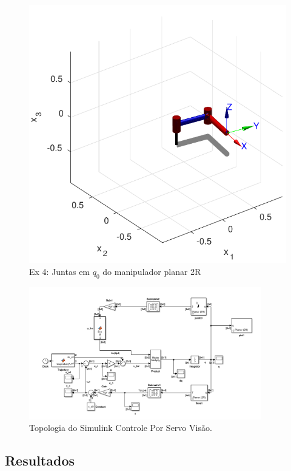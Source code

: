 \documentclass[a4paper,11pt]{article}
\theoremstyle{mytheor}
\begin{document}
\begin{figure}[ht]
\centering
\includegraphics[width=1\textwidth]{figs/ex3_planar_tetha0.pdf}
\caption{Ex 4: Juntas em $q_0$ do manipulador planar 2R}
\label{fig:ex3_planar}
\end{figure}

\begin{figure}[!ht]
\centering
\includegraphics[width=0.9\textwidth]{figs/ex3_simulink}
\caption{Topologia do Simulink Controle Por Servo Visão.}
\label{fig:ex3_simulink}
\end{figure}

\subsection{Resultados}
\end{document}
